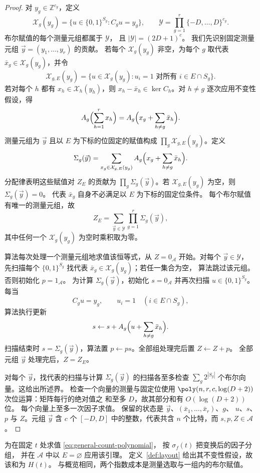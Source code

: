 \begin{proof}
对 $y_g\in\mathbb Z^{c_g}$，定义
\[
 \mathcal X_g(y_g)=\{u\in\{0,1\}^{S_g}:C_gu=y_g\},
 \qquad
 \mathcal Y=\prod_{g=1}^r\{-D,\ldots,D\}^{c_g}.
\]
布尔赋值的每个测量元组都属于 $\mathcal Y$，
且 $|\mathcal Y|=(2D+1)^c$。
我们先识别固定测量元组 $\vec y=(y_1,\ldots,y_r)$ 的贡献。
若每个 $\mathcal X_g(y_g)$ 非空，为每个 $g$ 取代表
$\bar x_g\in\mathcal X_g(y_g)$，并令
\[
 \mathcal X_{g,E}(y_g)=
 \{u\in\mathcal X_g(y_g):u_i=1\text{ 对所有 }i\in E\cap S_g\}.
\]
若对每个 $h$ 都有 $x_h\in\mathcal X_h(y_h)$，则
$x_h-\bar x_h\in\ker C_h$。对 $h\ne g$ 逐次应用不变性
假设，得
\[
 A_g\Bigl(\sum_{h=1}^r x_h\Bigr)
 =A_g\Bigl(x_g+\sum_{h\ne g}\bar x_h\Bigr).
\]
测量元组为 $\vec y$ 且以 $E$ 为下标的位固定的赋值构成
$\prod_g\mathcal X_{g,E}(y_g)$。定义
\begin{equation}\label{eq:group-sum}
 \Sigma_g(\vec y)=\sum_{x_g\in\mathcal X_{g,E}(y_g)}
       A_g\Bigl(x_g+\sum_{h\ne g}\bar x_h\Bigr).
\end{equation}
分配律表明这些赋值对 $Z_E$ 的贡献为
$\prod_g\Sigma_g(\vec y)$。若 $\mathcal X_{g,E}(y_g)$
为空，则 $\Sigma_g(\vec y)=0$。
代表 $\bar x_g$ 自身不必满足以 $E$ 为下标的固定位条件。
每个布尔赋值有唯一的测量元组，故
\[
 Z_E=\sum_{\vec y\in\mathcal Y}\prod_{g=1}^r\Sigma_g(\vec y),
\]
其中任何一个 $\mathcal X_g(y_g)$ 为空时乘积取为零。

算法每次处理一个测量元组地求值该恒等式，从
$Z=0_{\mathcal A}$ 开始。对每个 $\vec y\in\mathcal Y$，
先扫描每个 $\{0,1\}^{S_g}$ 找代表
$\bar x_g\in\mathcal X_g(y_g)$；若任一集合为空，
算法跳过该元组。否则初始化 $p=1_{\mathcal A}$。
为计算 $\Sigma_g(\vec y)$，初始化 $s=0_{\mathcal A}$
并再次扫描 $u\in\{0,1\}^{S_g}$。每当
\[
 C_gu=y_g,\qquad u_i=1\quad(i\in E\cap S_g),
\]
算法执行更新
\[
 s\leftarrow s+A_g\Bigl(u+\sum_{h\ne g}\bar x_h\Bigr).
\]
扫描结束时 $s=\Sigma_g(\vec y)$，算法置
$p\leftarrow ps$。全部组处理完后置 $Z\leftarrow Z+p$。
全部元组 $\vec y$ 处理完后，$Z=Z_E$。

对每个 $\vec y$，找代表的扫描与计算
$\Sigma_g(\vec y)$ 的扫描各至多检查
$\sum_g2^{|S_g|}$ 个布尔向量。这给出所述界。
检查一个向量的测量与固定位使用
$\poly(n,r,c,\log(D+2))$ 次位运算：矩阵每行的绝对值之
和至多 $D$，故其部分和有 $O(\log(D+2))$ 位。
每个向量上至多一次因子求值。
保留的状态是 $\vec y$、$(\bar x_1,\ldots,\bar x_r)$、$g$、
$u$、$s$、$p$ 与 $Z$。元组 $\vec y$ 含 $c$ 个 $[-D,D]$
中的整数，代表共含 $n$ 个比特，而 $s,p,Z\in\mathcal A$。
\end{proof}

为在固定 $t$ 处求值 \eqref{eq:general-count-polynomial}，
按 $\sigma_f(t)$ 把变换后的因子分组，
并在 $\mathcal A$ 中以 $E=\varnothing$ 应用该引理。
定义~\ref{def:layout} 给出其不变性假设，故该和为 $H(t)$。
与概览相同，两个指数成本是测量选取与一组内的布尔赋值。

